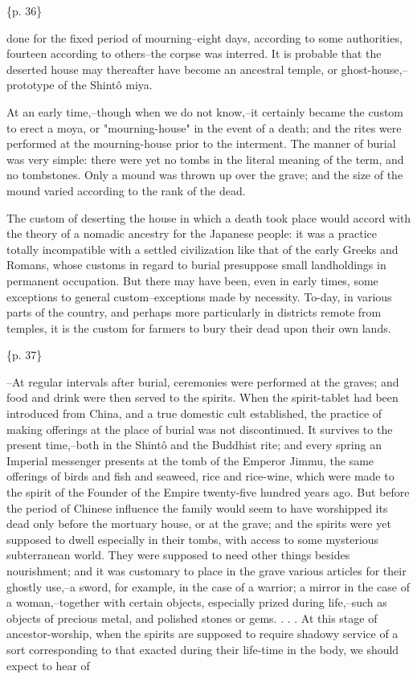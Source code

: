 \{p. 36\}

done for the fixed period of mourning--eight days, according to some authorities, fourteen according to others--the corpse was interred. It is probable that the deserted house may thereafter have become an ancestral temple, or ghost-house,--prototype of the Shintô miya.

At an early time,--though when we do not know,--it certainly became the custom to erect a moya, or "mourning-house" in the event of a death; and the rites were performed at the mourning-house prior to the interment. The manner of burial was very simple: there were yet no tombs in the literal meaning of the term, and no tombstones. Only a mound was thrown up over the grave; and the size of the mound varied according to the rank of the dead.

The custom of deserting the house in which a death took place would accord with the theory of a nomadic ancestry for the Japanese people: it was a practice totally incompatible with a settled civilization like that of the early Greeks and Romans, whose customs in regard to burial presuppose small landholdings in permanent occupation. But there may have been, even in early times, some exceptions to general custom--exceptions made by necessity. To-day, in various parts of the country, and perhaps more particularly in districts remote from temples, it is the custom for farmers to bury their dead upon their own lands.

\{p. 37\}

--At regular intervals after burial, ceremonies were performed at the graves; and food and drink were then served to the spirits. When the spirit-tablet had been introduced from China, and a true domestic cult established, the practice of making offerings at the place of burial was not discontinued. It survives to the present time,--both in the Shintô and the Buddhist rite; and every spring an Imperial messenger presents at the tomb of the Emperor Jimmu, the same offerings of birds and fish and seaweed, rice and rice-wine, which were made to the spirit of the Founder of the Empire twenty-five hundred years ago. But before the period of Chinese influence the family would seem to have worshipped its dead only before the mortuary house, or at the grave; and the spirits were yet supposed to dwell especially in their tombs, with access to some mysterious subterranean world. They were supposed to need other things besides nourishment; and it was customary to place in the grave various articles for their ghostly use,--a sword, for example, in the case of a warrior; a mirror in the case of a woman,--together with certain objects, especially prized during life,--such as objects of precious metal, and polished stones or gems. . . . At this stage of ancestor-worship, when the spirits are supposed to require shadowy service of a sort corresponding to that exacted during their life-time in the body, we should expect to hear of


